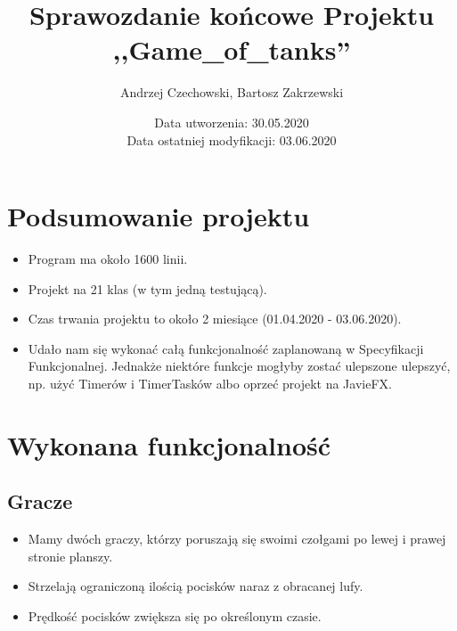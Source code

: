 \documentclass{article}
\title {Sprawozdanie końcowe Projektu\\ ,,Game\_of\_tanks''}
\author{Andrzej Czechowski, Bartosz Zakrzewski}
\date{Data utworzenia: 30.05.2020 \\ Data ostatniej modyfikacji: 03.06.2020}
\begin{document}
\maketitle
\thispagestyle{empty}
\newpage 

\section{Podsumowanie projektu}
\begin{itemize}
    \item Program ma około 1600 linii.
    \item Projekt na 21 klas (w tym jedną testującą).
    \item Czas trwania projektu to około 2 miesiące (01.04.2020 - 03.06.2020).
    \item Udało nam się wykonać całą funkcjonalność zaplanowaną w Specyfikacji Funkcjonalnej. Jednakże niektóre funkcje mogłyby zostać ulepszone ulepszyć, np. użyć Timerów i TimerTasków albo oprzeć projekt na JavieFX.
\end{itemize}

\section{Wykonana funkcjonalność}

\subsection{Gracze}
\begin{itemize}
    \item Mamy dwóch graczy, którzy poruszają się swoimi czołgami po lewej i prawej stronie planszy. 
    \item Strzelają ograniczoną ilością pocisków naraz z obracanej lufy. 
    \item Prędkość pocisków zwiększa się po określonym czasie.
\end{itemize}
\end{document}
